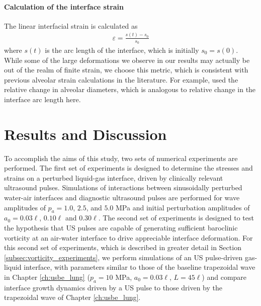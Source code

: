 \paragraph*{Calculation of the interface strain}
The linear interfacial strain is calculated as
\begin{align}%
  \label{eq:linear_strain}%
  \varepsilon = \frac{s(t) - s_0}{s_0}
\end{align}
where $s(t)$ is the arc length of the interface, which is initially
$s_0=s(0)$.  While some of the large deformations we observe in our
results may actually be out of the realm of finite strain, we choose
this metric, which is consistent with previous alveolar strain
calculations in the literature. For example, \cite{Roan2011} used the
relative change in alveolar diameters, which is analogous to relative
change in the interface arc length here.

\section{Results and Discussion}
To accomplish the aims of this study, two sets of numerical
experiments are performed. The first set of experiments is designed to
determine the stresses and strains on a perturbed liquid-gas
interface, driven by clinically relevant ultrasound
pulses. Simulations of interactions between sinusoidally perturbed
water-air interfaces and diagnostic ultrasound pulses are performed
for wave amplitudes of $p_a=1.0$, $2.5$, and $5.0$ MPa and initial
perturbation amplitudes of $a_0=0.03\ell$, $0.10\ell$ and
$0.30\ell$. The second set of experiments is designed to test the
hypothesis that \ac{US} pulses are capable of generating sufficient
baroclinic vorticity at an air-water interface to drive appreciable
interface deformation. For this second set of experiments, which is
described in greater detail in Section
\ref{subsec:vorticity_experiments}, we perform simulations of an
\ac{US} pulse-driven gas-liquid interface, with parameters similar to
those of the baseline trapezoidal wave in Chapter \ref{ch:usbe_lung}
($p_a = 10$ MPa, $a_0 = 0.03\ell$, $L=45\ell$) and compare interface
growth dynamics driven by a \ac{US} pulse to those driven by the
trapezoidal wave of Chapter \ref{ch:usbe_lung}.

